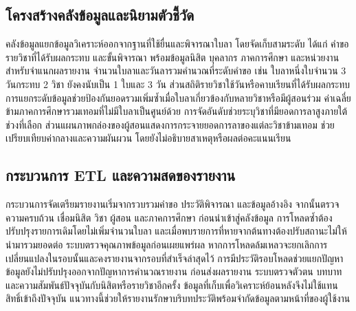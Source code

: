\subsection{โครงสร้างคลังข้อมูลและนิยามตัวชี้วัด}
คลังข้อมูลแยกข้อมูลวิเคราะห์ออกจากฐานที่ใช้ยื่นและพิจารณาใบลา โดยจัดเก็บสามระดับ ได้แก่ คำขอ รายวิชาที่ได้รับผลกระทบ และขั้นพิจารณา พร้อมข้อมูลนิสิต บุคลากร ภาคการศึกษา และหน่วยงานสำหรับจำแนกผลรายงาน \cite{warehouse}
จำนวนใบลาและวันลารวมคำนวณที่ระดับคำขอ เช่น ใบลาหนึ่งใบจำนวน 3 วันกระทบ 2 วิชา ยังคงนับเป็น 1 ใบและ 3 วัน ส่วนสถิติรายวิชาใช้วันหรือคาบเรียนที่ได้รับผลกระทบ การแยกระดับข้อมูลช่วยป้องกันยอดรวมเพิ่มซ้ำเมื่อใบลาเกี่ยวข้องกับหลายวิชาหรือมีผู้สอนร่วม
ค่าเฉลี่ยข้ามภาคการศึกษารวมเทอมที่ไม่มีใบลาเป็นศูนย์ด้วย การจัดอันดับช่วยระบุวิชาที่มียอดการลาสูงภายใต้ช่วงที่เลือก ส่วนแผนภาพกล่องของผู้สอนแสดงการกระจายยอดการลาของแต่ละวิชาข้ามเทอม ช่วยเปรียบเทียบค่ากลางและความผันผวน โดยยังไม่อธิบายสาเหตุหรือผลต่อคะแนนเรียน
\subsection{กระบวนการ ETL และความสดของรายงาน}
กระบวนการจัดเตรียมรายงานเริ่มจากรวบรวมคำขอ ประวัติพิจารณา และข้อมูลอ้างอิง จากนั้นตรวจความครบถ้วน เชื่อมนิสิต วิชา ผู้สอน และภาคการศึกษา ก่อนนำเข้าสู่คลังข้อมูล การโหลดซ้ำต้องปรับปรุงรายการเดิมโดยไม่เพิ่มจำนวนใบลา และเมื่อพบรายการที่หายจากต้นทางต้องปรับสถานะไม่ให้นำมารวมยอดต่อ
ระบบตรวจคุณภาพข้อมูลก่อนเผยแพร่ผล หากการโหลดล้มเหลวจะยกเลิกการเปลี่ยนแปลงในรอบนั้นและคงรายงานจากรอบที่สำเร็จล่าสุดไว้ การมีประวัติรอบโหลดช่วยแยกปัญหาข้อมูลยังไม่ปรับปรุงออกจากปัญหาการคำนวณรายงาน
ก่อนส่งผลรายงาน ระบบตรวจตัวตน บทบาท และความสัมพันธ์ปัจจุบันกับนิสิตหรือรายวิชาอีกครั้ง ข้อมูลที่เก็บเพื่อวิเคราะห์ย้อนหลังจึงไม่ใช้แทนสิทธิ์เข้าถึงปัจจุบัน แนวทางนี้ช่วยให้รายงานรักษาบริบทประวัติพร้อมจำกัดข้อมูลตามหน้าที่ของผู้ใช้งาน
